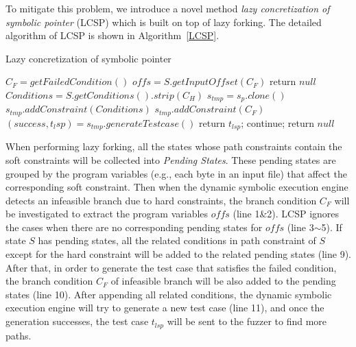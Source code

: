 To mitigate this problem, we introduce a novel method 
\emph{lazy concretization of symbolic pointer} (LCSP) 
which is built on top of lazy forking. The detailed algorithm 
of LCSP is shown in Algorithm~\ref{LCSP}.


 

\begin{algorithm}
 \LinesNumbered
  \caption{Lazy concretization of symbolic pointer}
  \label{LCSP}
  $C_F = getFailedCondition()$\;
  $offs = S.getInputOffset(C_F)$\;
  {
    return $null$\;
  }
  $Conditions = S.getConditions().strip(C_H)$\;
  {
    $s_{tmp} = s_p.clone()$\;
    $s_{tmp}.addConstraint(Conditions)$\;
    $s_{tmp}.addConstraint(C_F)$\;
    $(success, t_lsp) = s_{tmp}.generateTestcase()$\;
    {
      return $t_{lsp}$;
    } {
      continue;
    }
  }
  return $null$\;
\end{algorithm}

When performing lazy forking, all the states whose path constraints 
contain the soft constraints will be collected into \emph{Pending States}. 
These pending states are grouped by the program variables (e.g., each 
byte in an input file) that affect the corresponding soft constraint. 
Then when the dynamic symbolic execution engine detects an infeasible 
branch due to hard constraints, the branch condition $C_F$ will be 
investigated to extract the program variables $offs$ (line 1\&2). 
LCSP ignores the cases when there are no corresponding pending 
states for $offs$ (line 3$\sim$5). 
If state $S$ has pending states, all the related conditions in path 
constraint of $S$ except for the hard constraint will be added to the 
related pending states (line 9).
After that, in order to generate the test case that satisfies the failed 
condition, the branch condition $C_F$ of infeasible branch will be also 
added to the pending states (line 10).
After appending all related conditions, the dynamic symbolic execution 
engine will try to generate a new test case (line 11), and once the 
generation successes, the test case $t_{lsp}$ will be sent to the 
fuzzer to find more paths.

